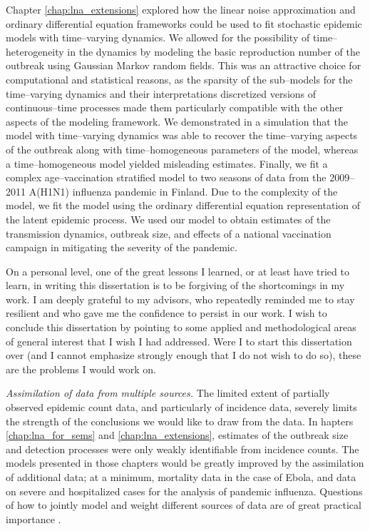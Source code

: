 Chapter \ref{chap:lna_extensions} explored how the linear noise approximation and ordinary differential equation frameworks could be used to fit stochastic epidemic models with time--varying dynamics. We allowed for the possibility of time--heterogeneity in the dynamics by modeling the basic reproduction number of the outbreak using Gaussian Markov random fields. This was an attractive choice for computational and statistical reasons, as the sparsity of the sub--models for the time--varying dynamics and their interpretations discretized versions of continuous--time processes made them particularly compatible with the other aspects of the modeling framework. We demonstrated in a simulation that the model with time--varying dynamics was able to recover the time--varying aspects of the outbreak along with time--homogeneous parameters of the model, whereas a time--homogeneous model yielded misleading estimates. Finally, we fit a complex age--vaccination stratified model to two seasons of data from the 2009--2011 A(H1N1) influenza pandemic in Finland. Due to the complexity of the model, we fit the model using the ordinary differential equation representation of the latent epidemic process. We used our model to obtain estimates of the transmission dynamics, outbreak size, and effects of a national vaccination campaign in mitigating the severity of the pandemic. 

On a personal level, one of the great lessons I learned, or at least have tried to learn, in writing this dissertation is to be forgiving of the shortcomings in my work. I am deeply grateful to my advisors, who repeatedly reminded me to stay resilient and who gave me the confidence to persist in our work. I wish to conclude this dissertation by pointing to some applied and methodological areas of general interest that I wish I had addressed. Were I to start this dissertation over (and I cannot emphasize strongly enough that I do not wish to do so), these are the problems I would work on. 

\textit{Assimilation of data from multiple sources.}
The limited extent of partially observed epidemic count data, and particularly of incidence data, severely limits the strength of the conclusions we would like to draw from the data. In hapters \ref{chap:lna_for_sems} and \ref{chap:lna_extensions}, estimates of the outbreak size and detection processes were only weakly identifiable from incidence counts. The models presented in those chapters would be greatly improved by the assimilation of additional data; at a minimum, mortality data in the case of Ebola, and data on severe and hospitalized cases for the analysis of pandemic influenza. Questions of how to jointly model and weight different sources of data are of great practical importance \cite{deangelis2015four}. 


